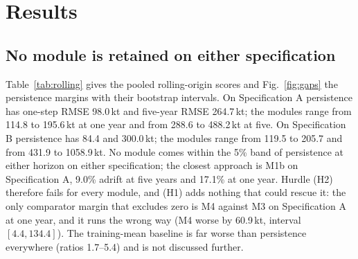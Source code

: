 \section{Results}\label{sec:results}

\FloatBarrier
\subsection{No module is retained on either specification}\label{sec:pooled}

Table~\ref{tab:rolling} gives the pooled rolling-origin scores and Fig.~\ref{fig:gaps} the persistence margins with their bootstrap intervals. On Specification A persistence has one-step RMSE 98.0\,kt and five-year RMSE 264.7\,kt; the modules range from 114.8 to 195.6\,kt at one year and from 288.6 to 488.2\,kt at five. On Specification B persistence has 84.4 and 300.0\,kt; the modules range from 119.5 to 205.7 and from 431.9 to 1058.9\,kt. No module comes within the 5\% band of persistence at either horizon on either specification; the closest approach is M1b on Specification A, 9.0\% adrift at five years and 17.1\% at one year. Hurdle (H2) therefore fails for every module, and (H1) adds nothing that could rescue it: the only comparator margin that excludes zero is M4 against M3 on Specification A at one year, and it runs the wrong way (M4 worse by 60.9\,kt, interval $[4.4, 134.4]$). The training-mean baseline is far worse than persistence everywhere (ratios 1.7--5.4) and is not discussed further.

